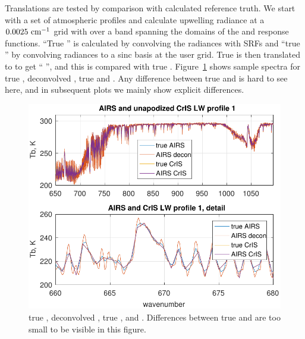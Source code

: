 \documentclass[10pt,twocolumn]{article}
\begin{document}
Translations are tested by comparison with calculated reference
truth.  We start with a set of atmospheric profiles and calculate
upwelling radiance at a $0.0025~\mbox{cm$^{-1}$}$ grid with {\kcarta}
\cite{kcarta1} over a band spanning the domains of the {\airs} and
{\cris} response functions.  ``True {\airs}'' is calculated by
convolving the {\kcarta} radiances with {\airs} SRFs and ``true
{\cris}'' by convolving {\kcarta} radiances to a sinc basis at the
{\cris} user grid.  True {\airs} is then translated to {\cris} to
get ``{\airs} {\cris}'', and this is compared with true {\cris}.
Figure~\ref{specLW} shows sample spectra for true {\airs},
deconvolved {\airs}, true {\cris} and {\airs} {\cris}.  Any
difference between true {\cris} and {\airs} {\cris} is hard to see
here, and in subsequent plots we mainly show explicit differences.

\begin{figure} %
  \centering
  \includegraphics[width=\linewidth]{figures/a2cris_spec_LW.pdf}
  \caption{true {\airs}, deconvolved {\airs}, true {\cris}, and {\airs}
    {\cris}.  Differences between true {\cris} and {\airs} {\cris} are too
    small to be visible in this figure.}
  \label{specLW}
\end{figure}
\end{document}
